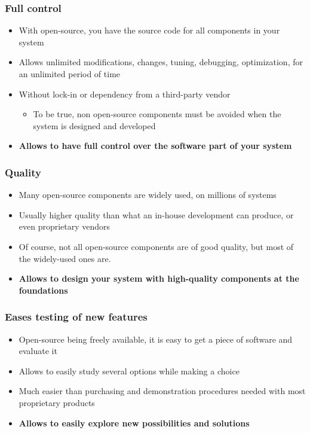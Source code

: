\begin{frame}
  \frametitle{Full control}
  \begin{itemize}
  \item With open-source, you have the source code for all components
    in your system
  \item Allows unlimited modifications, changes, tuning, debugging,
    optimization, for an unlimited period of time
  \item Without lock-in or dependency from a third-party vendor
    \begin{itemize}
    \item To be true, non open-source components must be avoided when
      the system is designed and developed
    \end{itemize}
  \item {\bf Allows to have full control over the software part of
      your system}
  \end{itemize}
\end{frame}

\begin{frame}
  \frametitle{Quality}
  \begin{itemize}
  \item Many open-source components are widely used, on millions of
    systems
  \item Usually higher quality than what an in-house development can
    produce, or even proprietary vendors
  \item Of course, not all open-source components are of good quality,
    but most of the widely-used ones are.
  \item {\bf Allows to design your system with high-quality components
      at the foundations}
\end{itemize}
\end{frame}

\begin{frame}
  \frametitle{Eases testing of new features}
  \begin{itemize}
  \item Open-source being freely available, it is easy to get a piece
    of software and evaluate it
  \item Allows to easily study several options while making a choice
  \item Much easier than purchasing and demonstration procedures
    needed with most proprietary products
  \item {\bf Allows to easily explore new possibilities and solutions}
  \end{itemize}
\end{frame}

